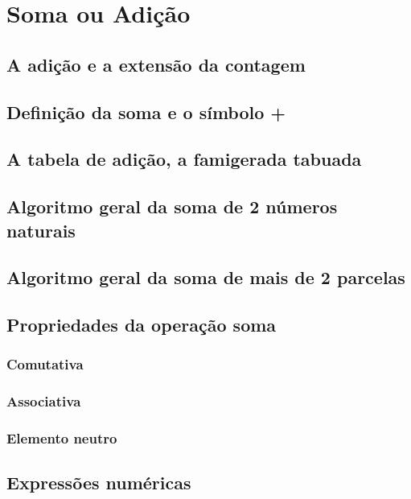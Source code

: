 \chapter[Soma ou Adição]{Soma ou Adição}

\section{A adição e a extensão da contagem}

\section{Definição da soma e o símbolo +}

\section{A tabela de adição, a famigerada tabuada}

\section{Algoritmo geral da soma de 2 números naturais}

\section{Algoritmo geral da soma de mais de 2 parcelas}

\section{Propriedades da operação soma}

\subsection{Comutativa}

\subsection{Associativa}

\subsection{Elemento neutro}

\section{Expressões numéricas}

